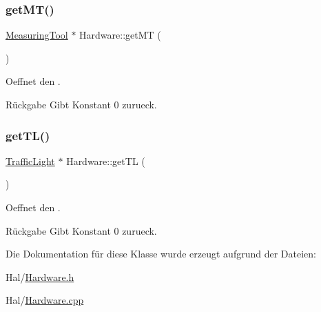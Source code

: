 \subsubsection{\texorpdfstring{get\+M\+T()}{getMT()}}
{\footnotesize\ttfamily \hyperlink{class_measuring_tool}{Measuring\+Tool} $\ast$ Hardware\+::get\+MT (\begin{DoxyParamCaption}{ }\end{DoxyParamCaption})}

Oeffnet den .

\begin{DoxyReturn}{Rückgabe}
Gibt Konstant 0 zurueck. 
\end{DoxyReturn}
\hypertarget{class_hardware_a558325fc00a829ca20112234a961b153}{}\label{class_hardware_a558325fc00a829ca20112234a961b153} 
\subsubsection{\texorpdfstring{get\+T\+L()}{getTL()}}
{\footnotesize\ttfamily \hyperlink{class_traffic_light}{Traffic\+Light} $\ast$ Hardware\+::get\+TL (\begin{DoxyParamCaption}{ }\end{DoxyParamCaption})}

Oeffnet den .

\begin{DoxyReturn}{Rückgabe}
Gibt Konstant 0 zurueck. 
\end{DoxyReturn}


Die Dokumentation für diese Klasse wurde erzeugt aufgrund der Dateien\+:\begin{DoxyCompactItemize}
\item 
Hal/\hyperlink{_hardware_8h}{Hardware.\+h}\item 
Hal/\hyperlink{_hardware_8cpp}{Hardware.\+cpp}\end{DoxyCompactItemize}
